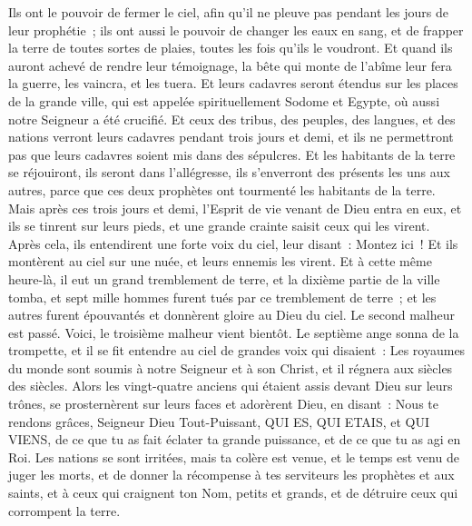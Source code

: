 \begin{multicols}{2}
Ils ont le pouvoir de fermer le ciel, afin qu'il ne pleuve pas pendant les jours de leur prophétie~; ils ont aussi le pouvoir de changer les eaux en sang, et de frapper la terre de toutes sortes de plaies, toutes les fois qu'ils le voudront.
Et quand ils auront achevé de rendre leur témoignage, la bête qui monte de l'abîme leur fera la guerre, les vaincra, et les tuera.
Et leurs cadavres seront étendus sur les places de la grande ville, qui est appelée spirituellement Sodome et Egypte, où aussi notre Seigneur a été crucifié.
Et ceux des tribus, des peuples, des langues, et des nations verront leurs cadavres pendant trois jours et demi, et ils ne permettront pas que leurs cadavres soient mis dans des sépulcres.
Et les habitants de la terre se réjouiront, ils seront dans l'allégresse, ils s'enverront des présents les uns aux autres, parce que ces deux prophètes ont tourmenté les habitants de la terre.
Mais après ces trois jours et demi, l'Esprit de vie venant de Dieu entra en eux, et ils se tinrent sur leurs pieds, et une grande crainte saisit ceux qui les virent.
Après cela, ils entendirent une forte voix du ciel, leur disant~: Montez ici~! Et ils montèrent au ciel sur une nuée, et leurs ennemis les virent.
Et à cette même heure-là, il eut un grand tremblement de terre, et la dixième partie de la ville tomba, et sept mille hommes furent tués par ce tremblement de terre~; et les autres furent épouvantés et donnèrent gloire au Dieu du ciel.
Le second malheur est passé. Voici, le troisième malheur vient bientôt.
Le septième ange sonna de la trompette, et il se fit entendre au ciel de grandes voix qui disaient~: Les royaumes du monde sont soumis à notre Seigneur et à son Christ, et il régnera aux siècles des siècles.
Alors les vingt-quatre anciens qui étaient assis devant Dieu sur leurs trônes, se prosternèrent sur leurs faces et adorèrent Dieu,
en disant~: Nous te rendons grâces, Seigneur Dieu Tout-Puissant, QUI ES, QUI ETAIS, et QUI VIENS, de ce que tu as fait éclater ta grande puissance, et de ce que tu as agi en Roi.
Les nations se sont irritées, mais ta colère est venue, et le temps est venu de juger les morts, et de donner la récompense à tes serviteurs les prophètes et aux saints, et à ceux qui craignent ton Nom, petits et grands, et de détruire ceux qui corrompent la terre.

\end{multicols}
